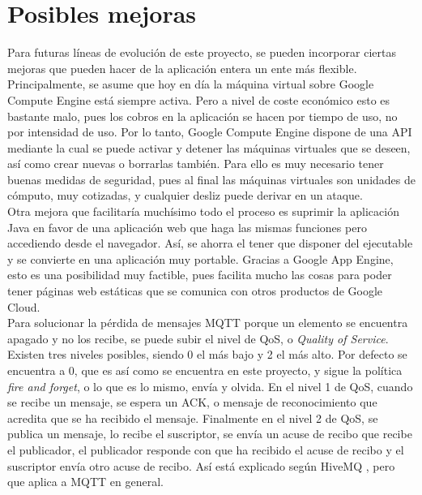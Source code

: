 \documentclass[12pt,spanish,listoffigures,listoftables]{tfgetsinf}
\begin{document}
\section{Posibles mejoras} 

Para futuras líneas de evolución de este proyecto, se pueden incorporar ciertas mejoras que pueden hacer de la aplicación entera un ente más flexible. \\

Principalmente, se asume que hoy en día la máquina virtual sobre Google Compute Engine está siempre activa. Pero a nivel de coste económico esto es bastante malo, pues los cobros en la aplicación se hacen por tiempo de uso, no por intensidad de uso. Por lo tanto, Google Compute Engine dispone de una API mediante la cual se puede activar y detener las máquinas virtuales que se deseen, así como crear nuevas o borrarlas también. Para ello es muy necesario tener buenas medidas de seguridad, pues al final las máquinas virtuales son unidades de cómputo, muy cotizadas, y cualquier desliz puede derivar en un ataque. \\

Otra mejora que facilitaría muchísimo todo el proceso es suprimir la aplicación Java en favor de una aplicación web que haga las mismas funciones pero accediendo desde el navegador. Así, se ahorra el tener que disponer del ejecutable y se convierte en una aplicación muy portable. Gracias a Google App Engine, esto es una posibilidad muy factible, pues facilita mucho las cosas para poder tener páginas web estáticas que se comunica con otros productos de Google Cloud. \\

Para solucionar la pérdida de mensajes MQTT porque un elemento se encuentra apagado y no los recibe, se puede subir el nivel de QoS, o \textit{Quality of Service}. Existen tres niveles posibles, siendo 0 el más bajo y 2 el más alto. Por defecto se encuentra a 0, que es así como se encuentra en este proyecto, y sigue la política \textit{fire and forget}, o lo que es lo mismo, envía y olvida. En el nivel 1 de QoS, cuando se recibe un mensaje, se espera un ACK, o mensaje de reconocimiento que acredita que se ha recibido el mensaje. Finalmente en el nivel 2 de QoS, se publica un mensaje, lo recibe el suscriptor, se envía un acuse de recibo que recibe el publicador, el publicador responde con que ha recibido el acuse de recibo y el suscriptor envía otro acuse de recibo. Así está explicado según HiveMQ \cite{QoS}, pero que aplica a MQTT en general. \\
\end{document}

